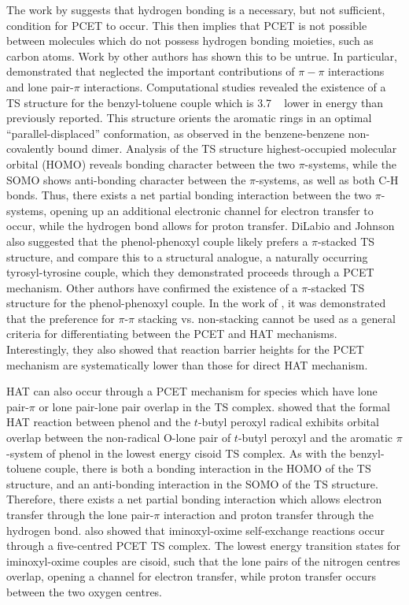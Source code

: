 The work by \citet{Mayer2002} suggests that hydrogen bonding is a necessary,
but not sufficient, condition for PCET to occur. This then implies that PCET is
not possible between molecules which do not possess hydrogen bonding moieties,
such as carbon atoms. Work by other authors has shown this to be
untrue.\cite{Hatcher2007, DiLabio2007} In particular, \citet{DiLabio2007}
demonstrated that \citet{Mayer2002} neglected the important contributions of
$\pi-\pi$ interactions and lone pair-$\pi$ interactions. Computational studies
revealed the existence of a TS structure for the benzyl-toluene couple which is
3.7 \kcalmol~ lower in energy than previously reported. This structure orients
the aromatic rings in an optimal ``parallel-displaced'' conformation, as
observed in the benzene-benzene non-covalently bound dimer.\cite{Sinnokrot2002}
Analysis of the TS structure highest-occupied molecular orbital (HOMO) reveals
bonding character between the two $\pi$-systems, while the SOMO shows
anti-bonding character between the $\pi$-systems, as well as both C-H bonds.
Thus, there exists a net partial bonding interaction between the two
$\pi$-systems, opening up an additional electronic channel for electron
transfer to occur, while the hydrogen bond allows for proton transfer. DiLabio
and Johnson also suggested that the phenol-phenoxyl couple likely prefers a
$\pi$-stacked TS structure, and compare this to a structural analogue, a
naturally occurring tyrosyl-tyrosine couple, which they demonstrated proceeds
through a PCET mechanism. Other authors have confirmed the existence of a
$\pi$-stacked TS structure for the phenol-phenoxyl
couple.\cite{Sirjoosingh2011, HammesSchiffer2015, MunozRugeles2017} In the work
of \citet{MunozRugeles2017}, it was demonstrated that the preference for
$\pi$-$\pi$ stacking vs. non-stacking cannot be used as a general criteria for
differentiating between the PCET and HAT mechanisms. Interestingly, they also
showed that reaction barrier heights for the PCET mechanism are systematically
lower than those for direct HAT mechanism.

HAT can also occur through a PCET mechanism for species which have lone
pair-$\pi$ or lone pair-lone pair overlap in the TS complex.\cite{DiLabio2007,
DiLabio2005} \citet{DiLabio2007} showed that the formal HAT reaction between
phenol and the $t$-butyl peroxyl radical exhibits orbital overlap between the
non-radical O-lone pair of $t$-butyl peroxyl and the aromatic $\pi$-system of
phenol in the lowest energy cisoid TS complex. As with the benzyl-toluene
couple, there is both a bonding interaction in the HOMO of the TS structure,
and an anti-bonding interaction in the SOMO of the TS structure. Therefore,
there exists a net partial bonding interaction which allows electron transfer
through the lone pair-$\pi$ interaction and proton transfer through the
hydrogen bond. \citet{DiLabio2005} also showed that iminoxyl-oxime
self-exchange reactions occur through a five-centred PCET TS complex. The
lowest energy transition states for iminoxyl-oxime couples are cisoid, such
that the lone pairs of the nitrogen centres overlap, opening a channel for
electron transfer, while proton transfer occurs between the two oxygen centres.

